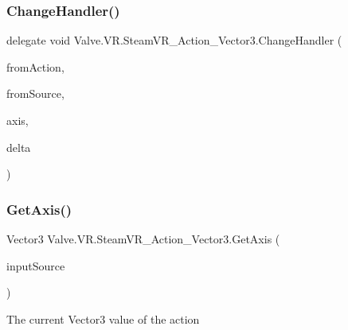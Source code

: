 \mbox{\label{class_valve_1_1_v_r_1_1_steam_v_r___action___vector3_a78943f89733a1c1a8e12cb4896e65907}} 
\subsubsection{\texorpdfstring{ChangeHandler()}{ChangeHandler()}}
{\footnotesize\ttfamily delegate void Valve.\+V\+R.\+Steam\+V\+R\+\_\+\+Action\+\_\+\+Vector3.\+Change\+Handler (\begin{DoxyParamCaption}\item[{\mbox{\hyperlink{class_valve_1_1_v_r_1_1_steam_v_r___action___vector3}{Steam\+V\+R\+\_\+\+Action\+\_\+\+Vector3}}}]{from\+Action,  }\item[{\mbox{\hyperlink{namespace_valve_1_1_v_r_a82e5bf501cc3aa155444ee3f0662853f}{Steam\+V\+R\+\_\+\+Input\+\_\+\+Sources}}}]{from\+Source,  }\item[{Vector3}]{axis,  }\item[{Vector3}]{delta }\end{DoxyParamCaption})}

\mbox{\label{class_valve_1_1_v_r_1_1_steam_v_r___action___vector3_ade2feaacf2acea8cd4baceb3d861fa20}} 
\subsubsection{\texorpdfstring{GetAxis()}{GetAxis()}}
{\footnotesize\ttfamily Vector3 Valve.\+V\+R.\+Steam\+V\+R\+\_\+\+Action\+\_\+\+Vector3.\+Get\+Axis (\begin{DoxyParamCaption}\item[{\mbox{\hyperlink{namespace_valve_1_1_v_r_a82e5bf501cc3aa155444ee3f0662853f}{Steam\+V\+R\+\_\+\+Input\+\_\+\+Sources}}}]{input\+Source }\end{DoxyParamCaption})}



The current Vector3 value of the action 


